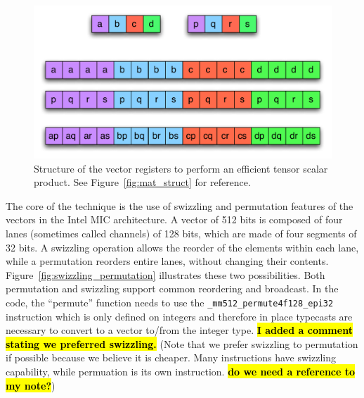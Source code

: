 \documentclass[10pt,conference,compsocconf]{IEEEtran}
\newcommand{\todo}[1]{{\color{red}\textbf{\hl{#1}}\xspace}}
\begin{document}
\begin{figure}
  \centering
  \includegraphics[width=\linewidth]{figures/tensor_product.pdf}
  \caption{Structure of the vector registers to perform an efficient
    tensor scalar product. See Figure~\ref{fig:mat_struct} for
    reference.}
  \label{fig:tensor_product}
\end{figure}

The core of the technique is the use of swizzling and permutation
features of the vectors in the Intel MIC architecture. A vector of 512
bits is composed of four lanes (sometimes called channels) of 128 bits, 
which are made of four segments of 32 bits. A swizzling operation allows
the reorder of the elements within each lane, while a permutation reorders
entire lanes, without changing their contents. 
Figure~\ref{fig:swizzling_permutation}
illustrates these two possibilities. Both permutation and swizzling
support common reordering and broadcast. In the code, the ``permute''
function needs to use the {\tt \_mm512\_permute4f128\_epi32}
instruction which is only defined on integers and therefore in place typecasts
are necessary to convert to a vector to/from the integer type.
\todo{I added a comment stating we preferred swizzling.}
(Note that we prefer swizzling to permutation if possible because we believe 
it is cheaper. Many instructions have swizzling capability, while permuation
is its own instruction. \todo{do we need a reference to my note?})
\end{document}
